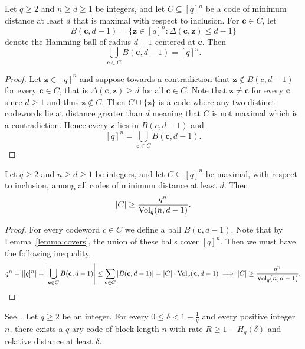 \begin{lemma}[Covering]
\label{lemma:covers}
\leanok
{}
Let $q \geq 2$ and $n \geq d \geq 1$ be integers, and let $C \subseteq [q]^{n}$ be a
code of minimum distance at least $d$ that is maximal with respect to inclusion.
For $\mathbf{c} \in C$, let
\[
  B(\mathbf{c}, d-1) = \{ \mathbf{z} \in [q]^{n} : \Delta(\mathbf{c}, \mathbf{z}) \le d-1 \}
\]
denote the Hamming ball of radius $d-1$ centered at $\mathbf{c}$.
Then
\[
  \bigcup_{\mathbf{c} \in C} B(\mathbf{c}, d-1) = [q]^{n}.
\]
\end{lemma}

\begin{proof}
  Let $\mathbf{z} \in [q]^{n}$ and suppose towards a contradiction that $\mathbf{z} \notin B(c, d-1)$ for every $\mathbf{c} \in C$, that is $\Delta(\mathbf{c}, \mathbf{z}) \geq d$ for all $\mathbf{c} \in C$.
  Note that $\mathbf{z} \neq \mathbf{c}$ for every $\mathbf{c}$ since $d \geq 1$ and thus $\mathbf{z} \notin C$.
  Then $C \cup \{\mathbf{z}\}$ is a code where any two distinct codewords lie at distance greater than $d$ meaning that $C$ is not maximal which is a contradiction.
  Hence every $\mathbf{z}$ lies in $B(c,d-1)$ and
  \[[q]^{n} = \bigcup_{\mathbf{c} \in C} B(\mathbf{c},d-1).\]
\end{proof}

\begin{lemma}
\label{lemma:MaximalPacking}
\leanok
{}
Let $q \geq 2$ and $n \geq d \geq 1$ be integers, and let $C \subseteq [q]^n$ be
maximal, with respect to inclusion, among all codes of minimum distance at
least $d$.
Then
\[
  |C| \geq \frac{q^n}{\operatorname{Vol}_q(n,d-1)}.
\]
\end{lemma}

\begin{proof}
  \leanok
  For every codeword $c \in C$ we define a ball $B(\mathbf{c},d-1)$.
  Note that by Lemma~\ref{lemma:covers}, the union of these balls cover $[q]^{n}$.
  Then we must have the following inequality,
  \[
  q^{n} =
  |[q]^{n}| = 
  \left|\bigcup_{\mathbf{c} \in C}B(\mathbf{c}, d-1)\right| \leq
  \sum_{\mathbf{c} \in C} |B(\mathbf{c},d-1)| =
  |C| \cdot \operatorname{Vol}_{q}(n,d-1) \implies
  |C| \geq \frac{q^{n}}{\operatorname{Vol}_{q}(n,d-1)}.
  \]
\end{proof}

\begin{theorem}
\label{thm:GVBgc}
\leanok
{}
See~\cite{GRS}.
Let $q \geq 2$ be an integer.
For every $0 \leq \delta < 1 - \frac{1}{q}$ and every positive integer $n$, there exists a $q$-ary code of block length $n$ with rate $R \geq 1 - H_q(\delta)$ and relative distance at least $\delta$.
\end{theorem}

